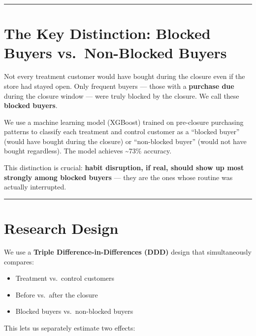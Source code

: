 \documentclass[
  letterpaper,
  DIV=11,
  numbers=noendperiod]{scrartcl}
\providecommand{\tightlist}{%
  \setlength{\itemsep}{0pt}\setlength{\parskip}{0pt}}
\begin{document}
\begin{center}\rule{0.5\linewidth}{0.5pt}\end{center}

\section{The Key Distinction: Blocked Buyers vs.~Non-Blocked
Buyers}\label{the-key-distinction-blocked-buyers-vs.-non-blocked-buyers}

Not every treatment customer would have bought during the closure even
if the store had stayed open. Only frequent buyers --- those with a
\textbf{purchase due} during the closure window --- were truly blocked
by the closure. We call these \textbf{blocked buyers}.

We use a machine learning model (XGBoost) trained on pre-closure
purchasing patterns to classify each treatment and control customer as a
``blocked buyer'' (would have bought during the closure) or
``non-blocked buyer'' (would not have bought regardless). The model
achieves \textasciitilde73\% accuracy.

This distinction is crucial: \textbf{habit disruption, if real, should
show up most strongly among blocked buyers} --- they are the ones whose
routine was actually interrupted.

\begin{center}\rule{0.5\linewidth}{0.5pt}\end{center}

\section{Research Design}\label{research-design}

We use a \textbf{Triple Difference-in-Differences (DDD)} design that
simultaneously compares:

\begin{itemize}
\tightlist
\item
  Treatment vs.~control customers
\item
  Before vs.~after the closure
\item
  Blocked buyers vs.~non-blocked buyers
\end{itemize}

This lets us separately estimate two effects:
\end{document}

